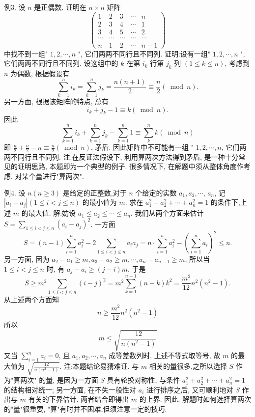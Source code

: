 例3. 设 $n$ 是正偶数.
证明在 $n \times n$ 矩阵
$$
\left(\begin{array}{ccccc}
1 & 2 & 3 & \cdots & n \\
2 & 3 & 4 & \cdots & 1 \\
3 & 4 & 5 & \cdots & 2 \\
\cdots & \cdots & \cdots & \cdots & \cdots \\
n & 1 & 2 & \cdots & n-1
\end{array}\right)
$$
中找不到一组" $1,2, \cdots, n$ ", 它们两两不同行且不同列.
证明:设有一组" $1,2, \cdots, n$ ", 它们两两不同行且不同列.
设这组中的 $k$ 在第 $i_k$ 行第 $j_k$ 列 $(1 \leqslant k \leqslant n)$, 考虑到 $n$ 为偶数, 根据假设有
$$
\sum_{k=1}^n i_k=\sum_{k=1}^n j_k=\frac{n(n+1)}{2} \equiv \frac{n}{2}(\bmod n) .
$$
另一方面, 根据该矩阵的特点, 总有
$$
i_k+j_k-1 \equiv k(\bmod n) .
$$
因此
$$
\sum_{k=1}^n i_k+\sum_{k=1}^n j_k-\sum_{k=1}^n 1 \equiv \sum_k^n k(\bmod n)
$$
即 $\frac{n}{2}+\frac{n}{2}-n \equiv \frac{n}{2}(\bmod n)$, 矛盾.
因此矩阵中不可能有一组 " $1,2, \cdots, n$, 它们两两不同行且不同列.
注:在反证法假设下, 利用算两次方法得到矛盾, 是一种十分常见的证明思路, 本题即为一个典型的例子.
很多情况下, 在解题中须从整体角度作考虑, 对某个量进行"算两次".



例4. 设 $n(n \geqslant 3)$ 是给定的正整数,对于 $n$ 个给定的实数 $a_1, a_2, \cdots$, $a_n$, 记 $\left|a_i-a_j\right|(1 \leqslant i<j \leqslant n)$ 的最小值为 $m$. 求在 $a_1^2+a_2^2+\cdots+a_n^2=1$ 的条件下,上述 $m$ 的最大值.
解:妨设 $a_1 \leqslant a_2 \leqslant \cdots \leqslant a_n$. 我们从两个方面来估计 $S=\sum_{1 \leqslant i<j \leqslant n}\left(a_i-a_j\right)^2$.
一方面
$$
S=(n-1) \sum_{i=1}^n a_i^2-2 \sum_{1 \leqslant i<j \leqslant n} a_i a_j=n \cdot \sum_{i=1}^n a_i^2-\left(\sum_{i=1}^n a_i\right)^2 \leqslant n .
$$
另一方面, 因为 $a_2-a_1 \geqslant m, a_3-a_2 \geqslant m, \cdots, a_n-a_{n-1} \geqslant m$, 所以当 $1 \leqslant i<j \leqslant n$ 时, 有 $a_j-a_i \geqslant(j-i) m$. 于是
$$
S \geqslant m^2 \sum_{1 \leqslant i<j \leqslant n}(i-j)^2=m^2 \sum_{k=1}^{n-1}(n-k) k^2=\frac{m^2}{12} n^2\left(n^2-1\right) .
$$
从上述两个方面知
$$
n \geqslant \frac{m^2}{12} n^2\left(n^2-1\right)
$$
所以
$$
m \leqslant \sqrt{\frac{12}{n\left(n^2-1\right)}}
$$
又当 $\sum_{i=1}^n a_i=0$, 且 $a_1, a_2, \cdots, a_n$ 成等差数列时, 上述不等式取等号, 故 $m$ 的最大值为 $\sqrt{\frac{12}{n\left(n^2-1\right)}}$.
注:本题结论易猜难证.
与 $m$ 相关的量很多,之所以选择 $S$ 作为"算两次" 的量, 是因为一方面 $S$ 具有轮换对称性, 与条件 $a_1^2+a_2^2+\cdots+a_n^2=1$ 的结构相对统一; 另一方面, 在不失一般性对 $a_i$ 进行排序之后, 又可顺利地对 $S$ 作出与 $m$ 有关的下界估计.
两者结合即得出 $m$ 的上界.
因此, 解题时如何选择算两次的"量"很重要, "算"有时并不困难,但须注意一定的技巧.



